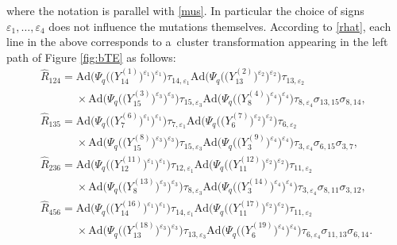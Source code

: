 \documentclass[pdftex]{sigma}
\numberwithin{equation}{section}
\begin{document}
where the notation is parallel with \eqref{mus}. In particular the
choice of signs $\varepsilon_1, \dots, \varepsilon_4$ does not
influence the mutations themselves.
%
According to \eqref{rhat}, each line in the above corresponds to a~cluster transformation appearing in the left path of
Figure \ref{fig:bTE} as follows:
\begin{gather}
\widehat{R}_{124} =
\mathrm{Ad}\bigl(\Psi_q\bigl(\bigl(Y^{(1)}_{14}\bigr)^{\varepsilon_1}\bigr)^{\varepsilon_1}\bigr)\tau_{14,\varepsilon_1}
\mathrm{Ad}\bigl(\Psi_q\bigl(\bigl(Y^{(2)}_{13}\bigr)^{\varepsilon_2}\bigr)^{\varepsilon_2}\bigr)\tau_{13,\varepsilon_2}\nonumber
\\
\phantom{\widehat{R}_{124} =}{} \times
\mathrm{Ad}\bigl(\Psi_q\bigl(\bigl(Y^{(3)}_{15}\bigr)^{\varepsilon_3}\bigr)^{\varepsilon_3}\bigr)\tau_{15,\varepsilon_3}
\mathrm{Ad}\bigl(\Psi_q\bigl(\bigl(Y^{(4)}_{8}\bigr)^{\varepsilon_4}\bigr)^{\varepsilon_4}\bigr)\tau_{8,\varepsilon_4}
\sigma_{13,15}\sigma_{8,14},\nonumber
\\
\widehat{R}_{135} =
\mathrm{Ad}\bigl(\Psi_q\bigl(\bigl(Y^{(6)}_{7}\bigr)^{\varepsilon_1}\bigr)^{\varepsilon_1}\bigr)\tau_{7,\varepsilon_1}
\mathrm{Ad}\bigl(\Psi_q\bigl(\bigl(Y^{(7)}_{6}\bigr)^{\varepsilon_2}\bigr)^{\varepsilon_2}\bigr)\tau_{6,\varepsilon_2}\nonumber
\\
\phantom{\widehat{R}_{135} =}{} \times
\mathrm{Ad}\bigl(\Psi_q\bigl(\bigl(Y^{(8)}_{15}\bigr)^{\varepsilon_3}\bigr)^{\varepsilon_3}\bigr)\tau_{15,\varepsilon_3}
\mathrm{Ad}\bigl(\Psi_q\bigl(\bigl(Y^{(9)}_{3}\bigr)^{\varepsilon_4}\bigr)^{\varepsilon_4}\bigr)\tau_{3,\varepsilon_4}
\sigma_{6,15}\sigma_{3,7},\nonumber
\\
\widehat{R}_{236} =
\mathrm{Ad}\bigl(\Psi_q\bigl(\bigl(Y^{(11)}_{12}\bigr)^{\varepsilon_1}\bigr)^{\varepsilon_1}\bigr)\tau_{12,\varepsilon_1}
\mathrm{Ad}\bigl(\Psi_q\bigl(\bigl(Y^{(12)}_{11}\bigr)^{\varepsilon_2}\bigr)^{\varepsilon_2}\bigr)\tau_{11,\varepsilon_2}\nonumber
\\
\phantom{\widehat{R}_{236} =}{} \times
\mathrm{Ad}\bigl(\Psi_q\bigl(\bigl(Y^{(13)}_{8}\bigr)^{\varepsilon_3}\bigr)^{\varepsilon_3}\bigr)\tau_{8,\varepsilon_3}
\mathrm{Ad}\bigl(\Psi_q\bigl(\bigl(Y^{(14)}_{3}\bigr)^{\varepsilon_4}\bigr)^{\varepsilon_4}\bigr)\tau_{3,\varepsilon_4}
\sigma_{8,11}\sigma_{3,12},\nonumber
\\
\widehat{R}_{456} =
\mathrm{Ad}\bigl(\Psi_q\bigl(\bigl(Y^{(16)}_{14}\bigr)^{\varepsilon_1}\bigr)^{\varepsilon_1}\bigr)\tau_{14,\varepsilon_1}
\mathrm{Ad}\bigl(\Psi_q\bigl(\bigl(Y^{(17)}_{11}\bigr)^{\varepsilon_2}\bigr)^{\varepsilon_2}\bigr)\tau_{11,\varepsilon_2}\nonumber
\\
\phantom{\widehat{R}_{456} =}{} \times
\mathrm{Ad}\bigl(\Psi_q\bigl(\bigl(Y^{(18)}_{13}\bigr)^{\varepsilon_3}\bigr)^{\varepsilon_3}\bigr)\tau_{13,\varepsilon_3}
\mathrm{Ad}\bigl(\Psi_q\bigl(\bigl(Y^{(19)}_{6}\bigr)^{\varepsilon_4}\bigr)^{\varepsilon_4}\bigr)\tau_{6,\varepsilon_4}
\sigma_{11,13}\sigma_{6,14}.\label{r124a}
\end{gather}
\end{document}
